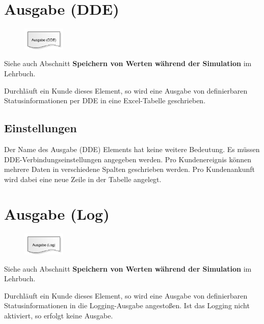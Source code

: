 \section{Ausgabe (DDE)}
\label{ref:ModelElementOutputDDE}

\begin{figure}
\vspace{-22pt}
\includegraphics[width=2cm]{imageModelElementOutputDDE.png}
\vspace{-22pt}
\end{figure}

Siehe auch Abschnitt \textbf{Speichern von Werten während der Simulation} im Lehrbuch.

Durchläuft ein Kunde dieses Element, so wird eine Ausgabe von definierbaren Statusinformationen per
DDE in eine Excel-Tabelle geschrieben.

\subsection*{Einstellungen}

Der Name des Ausgabe (DDE) Elements hat keine weitere Bedeutung. Es müssen DDE-Verbindungseinstellungen
angegeben werden.
Pro Kundenereignis können mehrere Daten in verschiedene Spalten geschrieben werden. Pro Kundenankunft
wird dabei eine neue Zeile in der Tabelle angelegt.


\section{Ausgabe (Log)}
\label{ref:ModelElementOutputLog}

\begin{figure}
\vspace{-22pt}
\includegraphics[width=2cm]{imageModelElementOutputLog.png}
\vspace{-22pt}
\end{figure}

Siehe auch Abschnitt \textbf{Speichern von Werten während der Simulation} im Lehrbuch.

Durchläuft ein Kunde dieses Element, so wird eine Ausgabe von definierbaren Statusinformationen in
die Logging-Ausgabe angestoßen. Ist das Logging nicht aktiviert, so erfolgt keine Ausgabe.

